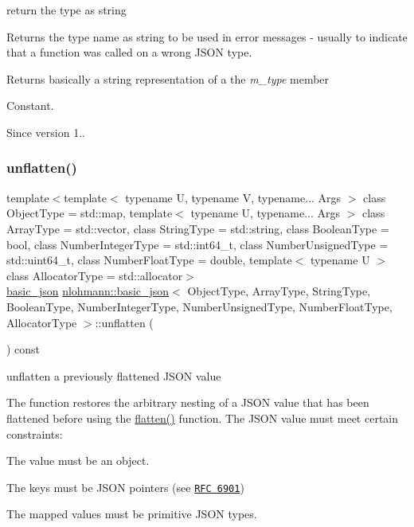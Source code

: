 return the type as string 

Returns the type name as string to be used in error messages -\/ usually to indicate that a function was called on a wrong J\+S\+ON type.

\begin{DoxyReturn}{Returns}
basically a string representation of a the {\itshape m\+\_\+type} member
\end{DoxyReturn}
Constant.

\begin{DoxySince}{Since}
version 1.. 
\end{DoxySince}
\hypertarget{classnlohmann_1_1basic__json_abc459edfac71c4ecc9347731f722026b}{}\label{classnlohmann_1_1basic__json_abc459edfac71c4ecc9347731f722026b} 
\subsubsection{\texorpdfstring{unflatten()}{unflatten()}}
{\footnotesize\ttfamily template$<$template$<$ typename U, typename V, typename... Args $>$ class Object\+Type = std\+::map, template$<$ typename U, typename... Args $>$ class Array\+Type = std\+::vector, class String\+Type  = std\+::string, class Boolean\+Type  = bool, class Number\+Integer\+Type  = std\+::int64\+\_\+t, class Number\+Unsigned\+Type  = std\+::uint64\+\_\+t, class Number\+Float\+Type  = double, template$<$ typename U $>$ class Allocator\+Type = std\+::allocator$>$ \\
\hyperlink{classnlohmann_1_1basic__json}{basic\+\_\+json} \hyperlink{classnlohmann_1_1basic__json}{nlohmann\+::basic\+\_\+json}$<$ Object\+Type, Array\+Type, String\+Type, Boolean\+Type, Number\+Integer\+Type, Number\+Unsigned\+Type, Number\+Float\+Type, Allocator\+Type $>$\+::unflatten (\begin{DoxyParamCaption}{ }\end{DoxyParamCaption}) const\hspace{0.3cm}{\ttfamily [inline]}}



unflatten a previously flattened J\+S\+ON value 

The function restores the arbitrary nesting of a J\+S\+ON value that has been flattened before using the \hyperlink{classnlohmann_1_1basic__json_a54d58e56e8a67aaf0c2f3a3a05a76bba}{flatten()} function. The J\+S\+ON value must meet certain constraints\+:
\begin{DoxyEnumerate}
\item The value must be an object.
\item The keys must be J\+S\+ON pointers (see \href{https://tools.ietf.org/html/rfc6901}{\tt R\+FC 6901})
\item The mapped values must be primitive J\+S\+ON types.
\end{DoxyEnumerate}


